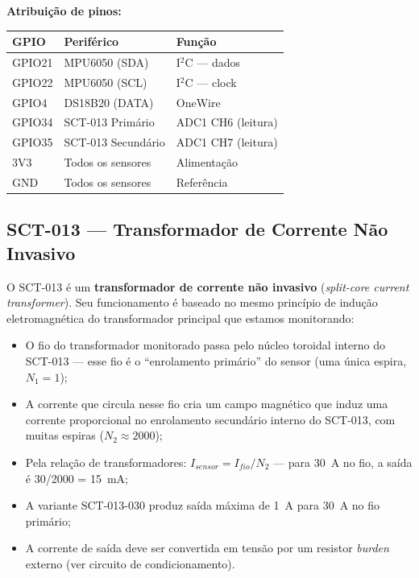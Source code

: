 \documentclass[12pt, a4paper]{article}
\begin{document}
\noindent\textbf{Atribuição de pinos:}

\begin{center}
\begin{tabular}{lll}
\toprule
\textbf{GPIO} & \textbf{Periférico} & \textbf{Função} \\
\midrule
GPIO21       & MPU6050 (SDA)            & I$^2$C --- dados    \\
GPIO22       & MPU6050 (SCL)            & I$^2$C --- clock    \\
GPIO4        & DS18B20 (DATA)           & OneWire             \\
GPIO34       & SCT-013 Primário         & ADC1 CH6 (leitura)  \\
GPIO35       & SCT-013 Secundário       & ADC1 CH7 (leitura)  \\
3V3          & Todos os sensores        & Alimentação         \\
GND          & Todos os sensores        & Referência          \\
\bottomrule
\end{tabular}
\end{center}

\subsection{SCT-013 --- Transformador de Corrente Não Invasivo}

O SCT-013 é um \textbf{transformador de corrente não invasivo} (\textit{split-core current transformer}). Seu funcionamento é baseado no mesmo princípio de indução eletromagnética do transformador principal que estamos monitorando:

\begin{itemize}[leftmargin=2cm]
    \item O fio do transformador monitorado passa pelo núcleo toroidal interno do SCT-013 --- esse fio é o ``enrolamento primário'' do sensor (uma única espira, $N_1 = 1$);
    \item A corrente que circula nesse fio cria um campo magnético que induz uma corrente proporcional no enrolamento secundário interno do SCT-013, com muitas espiras ($N_2 \approx 2000$);
    \item Pela relação de transformadores: $I_{sensor} = I_{fio} / N_2$ --- para 30~A no fio, a saída é 30/2000 = 15~mA;
    \item A variante SCT-013-030 produz saída máxima de 1~A para 30~A no fio primário;
    \item A corrente de saída deve ser convertida em tensão por um resistor \textit{burden} externo (ver circuito de condicionamento).
\end{itemize}
\end{document}
